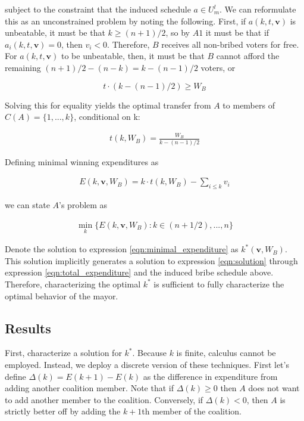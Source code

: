 \documentclass[12pt,a4paper]{article}
\begin{document}
subject to the constraint that the induced schedule $a \in U_m^l$. We can reformulate this as an unconstrained problem by noting the following. First, if $a(k, t, \mathbf{v})$ is unbeatable, it must be that $k \geq (n + 1)/2$, so by $A1$ it must be that if $a_i(k, t, \mathbf{v}) = 0$, then $v_i < 0$. Therefore, $B$ receives all non-bribed voters for free. For $a(k, t, \mathbf{v})$ to be unbeatable, then, it must be that $B$ cannot afford the remaining $(n + 1)/2 - (n - k) = k - (n - 1)/2$ voters, or

$$t \cdot (k - (n - 1)/2) \geq W_B$$

Solving this for equality yields the optimal transfer from $A$ to members of $C(A) = \{1, ..., k\}$, conditional on k:

\begin{align}
    \label{eqn:common_transfer}
    t(k, W_B) = \frac{W_B}{k - (n - 1)/2}
\end{align}

Defining minimal winning expenditures as

\begin{align}
    \label{eqn:total_expenditure}
    E(k, \mathbf{v}, W_B) = k \cdot t(k, W_B) - \sum_{i \leq k} v_i
\end{align}

we can state $A$'s problem as

\begin{align}
\label{eqn:minimal_expenditure}
\min_k \{E(k, \mathbf{v}, W_B) : k \in {(n + 1/2), ..., n}\}
\end{align}

Denote the solution to expression \ref{eqn:minimal_expenditure} as $k^*(\mathbf{v}, W_B)$. This solution implicitly generates a solution to expression \ref{eqn:solution} through expression \ref{eqn:total_expenditure} and the induced bribe schedule above. Therefore, characterizing the optimal $k^*$ is sufficient to fully characterize the optimal behavior of the mayor.

\subsection*{Results}

First, characterize a solution for $k^*$. Because $k$ is finite, calculus cannot be employed. Instead, we deploy a discrete version of these techniques. First let's define $\Delta(k) = E(k + 1) - E(k)$ as the difference in expenditure from adding another coalition member. Note that if $\Delta(k) \geq 0$ then $A$ does not want to add another member to the coalition. Conversely, if $\Delta(k) < 0$, then $A$ is strictly better off by adding the $k + 1$th member of the coalition.
\end{document}
